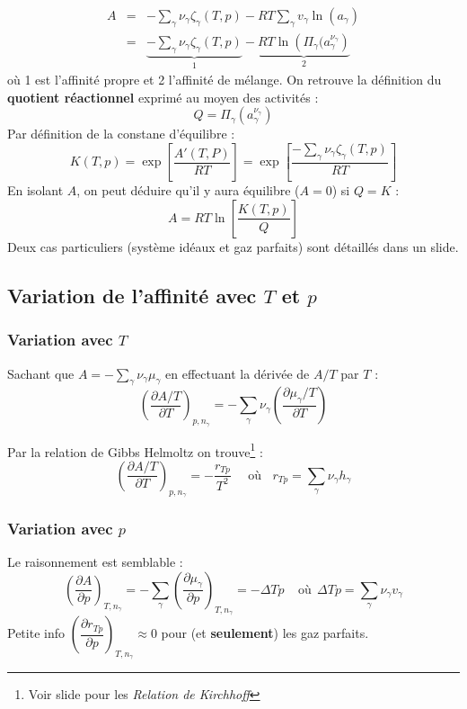 \documentclass[11pt, a4paper, openany]{book}
\begin{document}
\begin{eqnarray}
A &=& - \sum_\gamma \nu_\gamma\zeta_\gamma(T,p) - RT\sum_\gamma v_\gamma \ln(a_\gamma)\\
 &=& \underbrace{-\sum_\gamma \nu_\gamma\zeta_\gamma(T,p)}_1 -\underbrace{RT\ln\left(\Pi_\gamma(a_\gamma^{\nu_\gamma}\right)}_2
\end{eqnarray}
où 1 est l'affinité propre et 2 l'affinité de mélange. On retrouve la définition du \textbf{quotient réactionnel} exprimé au moyen des activités : 
\begin{equation}
Q = \Pi_\gamma \left(a_\gamma^{\nu_\gamma}\right)
\end{equation}
Par définition de la constane d'équilibre : 
\begin{equation}
K(T,p) = \exp\left[\dfrac{A'(T,P)}{RT}\right] = \exp\left[\dfrac{-\sum_\gamma  \nu_\gamma \zeta_\gamma(T,p) }{RT} \right]
\end{equation} 
En isolant $A$, on peut déduire qu'il y aura équilibre ($A = 0$) si $Q = K$ :
\begin{equation}
A = RT \ln\left[\frac{K(T,p)}{Q} \right]
\end{equation}
Deux cas particuliers (système idéaux et gaz parfaits) sont détaillés dans un slide.

\subsection{Variation de l'affinité avec $T$ et $p$}
\subsubsection{Variation avec $T$}
Sachant que $A = -\sum_\gamma \nu_\gamma \mu_\gamma$ en effectuant la dérivée de $A/T$ par $T$ :
\begin{equation}
\left(\frac{\partial A/T}{\partial T}\right)_{p,n_\gamma} = - \sum_\gamma \nu_\gamma \left(\dfrac{\partial \mu_\gamma / T}{\partial T}\right)
\end{equation}

Par la relation de Gibbs Helmoltz on trouve\footnote{Voir slide pour les \textit{Relation de Kirchhoff}} :
\begin{equation}
\left(\frac{\partial A/T}{\partial T}\right)_{p,n_\gamma} = -\dfrac{r_{Tp}}{T^2}\ \ \ \ \ \ \text{où}\  \ \ \ r_{Tp} = \sum_\gamma \nu_\gamma h_\gamma
\end{equation}

\subsubsection{Variation avec $p$}
Le raisonnement est semblable :
\begin{equation}
\left(\dfrac{\partial A}{\partial p}\right)_{T, n_\gamma} = - \sum_\gamma \left(\dfrac{\partial \mu_\gamma}{\partial p}\right)_{T, n_\gamma} = -\Delta Tp\ \ \ \ \ \text{où}\ \ \Delta Tp = \sum_\gamma \nu_\gamma v_\gamma
\end{equation}
Petite info $\left(\dfrac{\partial r_{Tp}}{\partial p}\right)_{T, n_\gamma} \approx 0$ pour (et \textbf{seulement}) les gaz parfaits.\\
\end{document}
